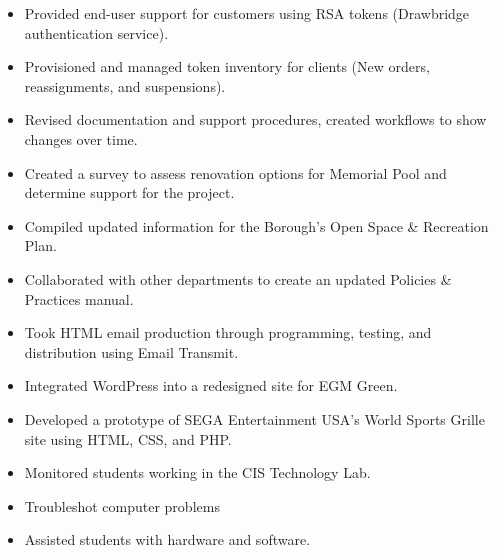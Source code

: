 \documentclass[letterpaper,12pt]{article}
\begin{document}
%
\begin{itemize}%
  \item
  Provided end-user support for customers using RSA tokens (Drawbridge authentication service).
  \item
  Provisioned and managed token inventory for clients (New orders, reassignments, and suspensions).
  \item
  Revised documentation and support procedures, created workflows to show changes over time.
\end{itemize}
%
\begin{itemize}%
  \item
  Created a survey to assess renovation options for Memorial Pool and determine support for the project.
  \item
  Compiled updated information for the Borough’s Open Space \& Recreation Plan.
  \item
  Collaborated with other departments to create an updated Policies \&
  Practices manual.
\end{itemize}
%
\begin{itemize}%
  \item
  Took HTML email production through programming, testing, and distribution using Email Transmit.
\item
  Integrated WordPress into a redesigned site for EGM Green.
\item
  Developed a prototype of SEGA Entertainment USA’s World Sports Grille site using HTML, CSS, and PHP.
\end{itemize}
\pagebreak[4]
%
\begin{itemize}%
  \item
  Monitored students working in the CIS Technology Lab.
\item
  Troubleshot computer problems
\item
  Assisted students with hardware and software.
\end{itemize}
\end{document}

